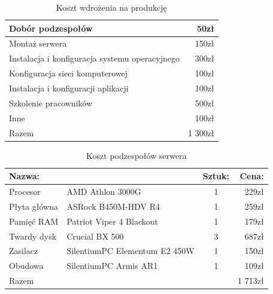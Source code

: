 \documentclass[12pt,a4paper]{article}
\begin{document}
		\begin{table}[!hbp]
			\center
			\begin{tabular}{|l|r|}
				\hline
				Dobór podzespołów & 50zł \\				
				\hline
				Montaż serwera & 150zł \\
				\hline
				Instalacja i konfiguracja systemu operacyjnego & 300zł \\
				\hline
				Konfiguracja sieci komputerowej & 100zł \\
				\hline
				Instalacja i konfiguracji aplikacji & 100zł \\
				\hline
				Szkolenie pracowników & 500zł \\
				\hline
				Inne & 100zł \\
				\hline
				Razem & 1 300zł\\
				\hline
			\end{tabular}
			\caption{Koszt wdrożenia na produkcję}
			\label{tab:Koszt wdrożenie na produkcję}
		\end{table}
		
		\begin{table}[!hbp]
			\center
			\begin{tabular}{|l|l|c|r|}
				\hline
				\multicolumn{2}{|l|}{Nazwa:} & Sztuk: & Cena: \\
				\hline
				Procesor & AMD Athlon 3000G & 1 & 229zł \\
				\hline
				Płyta główna & ASRock B450M-HDV R4 & 1 & 259zł \\
				\hline
				Pamięć RAM & Patriot Viper 4 Blackout & 1 & 179zł \\
				\hline
				Twardy dysk & Crucial BX 500 & 3 & 687zł \\
				\hline
				Zasilacz & SilentiumPC Elementum E2 450W & 1 & 150zł \\
				\hline
				Obudowa & SilentiumPC Armis AR1 & 1 & 109zł \\
				\hline
				\multicolumn{3}{|l|}{Razem} & 1 713zł \\
				\hline
			\end{tabular}
			\caption{Koszt podzespołów serwera}
			\label{tab:Koszt podzespołów serwera}
		\end{table}
	
	\newpage
	
\end{document}
